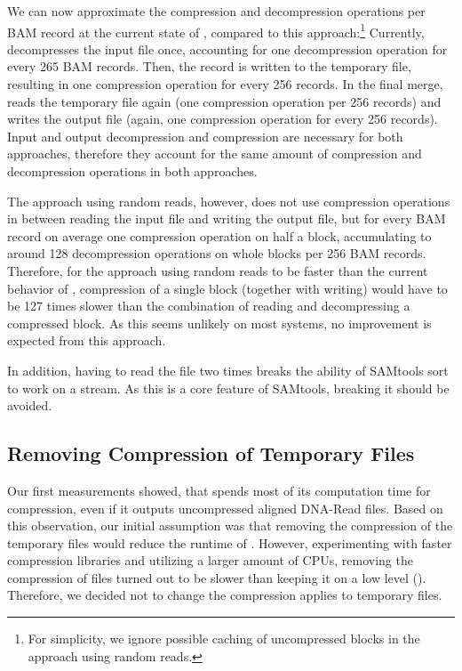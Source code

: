 We can now approximate the compression and decompression operations per BAM record at the current state of \sort, compared to this approach:\footnote{For simplicity, we ignore possible caching of uncompressed blocks in the approach using random reads.} Currently, \sort decompresses the input file once, accounting for one decompression operation for every 265 BAM records. Then, the record is written to the temporary file, resulting in one compression operation for every 256 records. In the final merge, \sort reads the temporary file again (one compression operation per 256 records) and writes the output file (again, one compression operation for every 256 records). Input and output decompression and compression are necessary for both approaches, therefore they account for the same amount of compression and decompression operations in both approaches.

The approach using random reads, however, does not use compression operations in between reading the input file and writing the output file, but for every BAM record on average one compression operation on half a block, accumulating to around 128 decompression operations on whole blocks per 256 BAM records. Therefore, for the approach using random reads to be faster than the current behavior of \sort, compression of a single block (together with writing) would have to be 127 times slower than the combination of reading and decompressing a compressed block. As this seems unlikely on most systems, no improvement is expected from this approach. 

In addition, having to read the file two times breaks the ability of SAMtools sort to work on a stream. As this is a core feature of SAMtools, breaking it should be avoided.

\subsection{Removing Compression of Temporary Files}
Our first measurements showed, that \sort spends most of its computation time for compression, even if it outputs uncompressed aligned DNA-Read files. Based on this observation, our initial assumption was that removing the compression of the temporary files would reduce the runtime of \sort. However, experimenting with faster compression libraries and utilizing a larger amount of CPUs, removing the compression of files turned out to be slower than keeping it on a low level (). Therefore, we decided not to change the compression \sort applies to temporary files. 